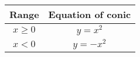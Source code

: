 \begin{tabular}{|c|c|}
	\hline
	Range & Equation of conic\\
	\hline
	$x \geq 0$ & $y = x^2$\\
	\hline
	$x < 0$ & $y = -x^2$\\
	\hline
\end{tabular}
